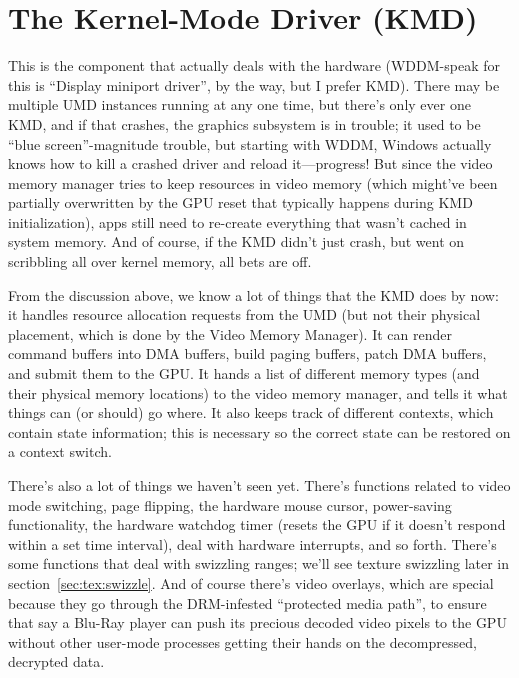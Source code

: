 \section{The Kernel-Mode Driver (KMD)}

This is the component that actually deals with the hardware (WDDM-speak for 
this is ``Display miniport driver'', by the way, but I prefer KMD).  There may 
be multiple
UMD instances running at any one time, but there's only ever one KMD, and if
that crashes, the graphics subsystem is in trouble; it used to be ``blue 
screen''-magnitude trouble, but starting with WDDM, Windows actually knows how 
to kill a crashed driver and reload it---progress! But since the video memory 
manager tries to keep resources in video memory (which might've been partially 
overwritten by the GPU reset that typically happens during KMD initialization), 
apps still need to re-create everything that wasn't cached in system memory.  
And of course, if the KMD didn't just crash, but went on scribbling all over 
kernel memory, all bets are off.

From the discussion above, we know a lot of things that the KMD does by now: it 
handles resource allocation requests from the UMD (but not their physical 
placement, which is done by the Video Memory Manager). It can render command 
buffers into DMA buffers, build paging buffers, patch DMA buffers, and submit 
them to the GPU. It hands a list of different memory types (and their physical 
memory locations) to the video memory manager, and tells it what things can (or 
should) go where. It also keeps track of different contexts, which contain 
state information; this is necessary so the correct state can be restored on 
a context switch.

There's also a lot of things we haven't seen yet. There's functions related to 
video mode switching, page flipping, the hardware mouse cursor, power-saving 
functionality, the hardware watchdog timer (resets the GPU if it doesn't 
respond within a set time interval), deal with hardware interrupts, and so 
forth.  There's some functions that deal with swizzling ranges; we'll see 
texture swizzling later in section~\ref{sec:tex:swizzle}. And of course there's 
video overlays, which are special because they go through the DRM-infested 
``protected media path'', to ensure that say a Blu-Ray player can push its 
precious decoded video pixels to the GPU without other user-mode processes 
getting their hands on the decompressed, decrypted data.


